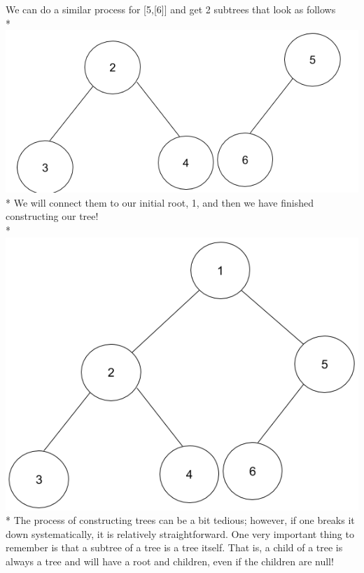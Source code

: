 \documentclass{article}
\begin{document}
We can do a similar process for [5,[6]] and get 2 subtrees that look as follows  \\*
\includegraphics[scale=.34]{../images/treeex5.png} \\*
We will connect them to our initial root, 1, and then we have finished constructing our tree! \\*
\includegraphics[scale=.34]{../images/treeexample.png}  \\*
The process of constructing trees can be a bit tedious; however, if one breaks it down systematically, it is relatively straightforward. One very important thing to remember is that a subtree of a tree is a tree itself. That is, a child of a tree is always a tree and will have a root and children, even if the children are null! 
\end{document}
